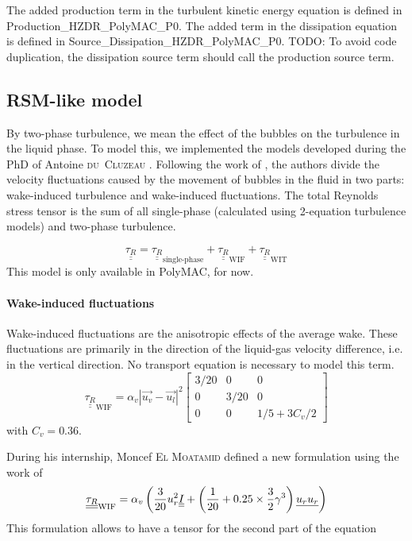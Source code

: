 The added production term in the turbulent kinetic energy equation is defined in Production_HZDR_PolyMAC_P0. The added term in the dissipation equation is defined in Source_Dissipation_HZDR_PolyMAC_P0. TODO: To avoid code duplication, the dissipation source term should call the production source term.

\subsection{RSM-like model}\label{subsec:RSM}
By two-phase turbulence, we mean the effect of the bubbles on the turbulence in the liquid phase. To model this, we implemented the models developed during the PhD of Antoine \textsc{du~Cluzeau} \cite{DuCluzeau2019, Cluzeau2019, Cluzeau2019a}. Following the work of \textcite{Risso2018}, the authors divide the velocity fluctuations caused by the movement of bubbles in the fluid in two parts: wake-induced turbulence and wake-induced fluctuations. The total Reynolds stress tensor is the sum of all single-phase (calculated using 2-equation turbulence models) and two-phase turbulence.

\begin{equation}
	\underline{\underline{\tau_R}} 	=
	      \underline{\underline{\tau_R}}_{\text{single-phase}}
		+ \underline{\underline{\tau_R}}_{\text{WIF}}
		+ \underline{\underline{\tau_R}}_{\text{WIT}}
\end{equation}
This model is only available in PolyMAC, for now.

\paragraph{Wake-induced fluctuations}\mbox{}

Wake-induced fluctuations are the anisotropic effects of the average wake. These fluctuations are primarily in the direction of the liquid-gas velocity difference, i.e. in the vertical direction. No transport equation is necessary to model this term.
\begin{equation}
	\underline{\underline{\tau_R}}_{\text{WIF}} =
	\alpha_v |\overrightarrow{u_v}-\overrightarrow{u_l}|^2
	\begin{bmatrix}
		3/20 & 0 & 0 \\
		0 & 3/20 & 0 \\
		0 & 0 & 1/5+3C_v/2
	\end{bmatrix}
\end{equation}
with $C_v = 0.36$.

During his internship, Moncef \textsc{El Moatamid} defined a new formulation using the work of \textcite{Biesheuvel1984}
\begin{equation}
	\underline{\underline{\tau_R}}_{\text{WIF}} =
	\alpha_v \left( \frac{3}{20}u_r^2 \underline{\underline{I}} + \left( \frac{1}{20}+0.25\times{}\frac{3}{2}\gamma^3 \right)\underline{u_r}\underline{u_r} \right)
\end{equation}
This formulation allows to have a tensor for the second part of the equation

